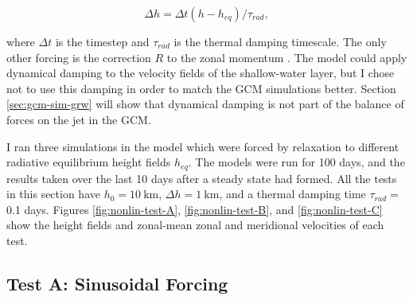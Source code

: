 \begin{equation}
  \Delta h = \Delta t (h - h_{eq}) / \tau_{rad} ,
\end{equation}

where $\Delta t$ is the timestep and $\tau_{rad}$ is the thermal damping timescale. The only other forcing is the correction $R$ to the zonal momentum \citep{shell2004superrotation}. The model could apply dynamical damping to the velocity fields of the shallow-water layer, but I chose not to use this damping in order to match the GCM simulations better. Section \ref{sec:gcm-sim-grw} will show that dynamical damping is not part of the balance of forces on the jet in the GCM.

I ran three simulations in the model which were forced by relaxation to different radiative equilibrium height fields $h_{eq}$. The models were run for 100 days, and the results taken over the last 10 days after a steady state had formed.  All the tests in this section have $h_{0} = \SI{10}{\kilo\metre}$, $\Delta h = \SI{1}{\kilo\metre}$, and a thermal damping time $\tau_{rad}=$ 0.1 days. Figures \ref{fig:nonlin-test-A}, \ref{fig:nonlin-test-B}, and \ref{fig:nonlin-test-C} show the height fields and zonal-mean zonal and meridional velocities of each test.








\subsection{Test A: Sinusoidal Forcing}



